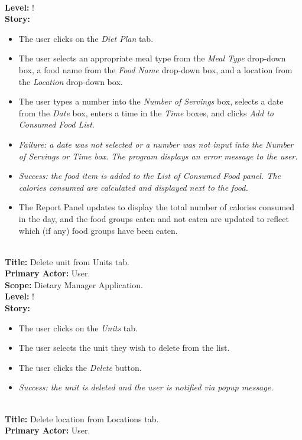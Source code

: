 \documentclass{article}
\begin{document}
\\
\textbf{Level:} !
\\
\textbf{Story:}
\begin{itemize}
    \item The user clicks on the \textit{Diet Plan} tab.
    \item The user selects an appropriate meal type from the \textit{Meal Type} drop-down box, a food name from the \textit{Food Name} drop-down box, and a location from the \textit{Location} drop-down box.
    \item The user types a number into the \textit{Number of Servings} box, selects a date from the \textit{Date} box, enters a time in the \textit{Time} boxes, and clicks \textit{Add to Consumed Food List}.
    \item \em Failure: \em a date was not selected or a number was not input into the Number of Servings or Time box. The program displays an error message to the user.
    \item \em Success: \em the food item is added to the List of Consumed Food panel. The calories consumed are calculated and displayed next to the food.
    \item The Report Panel updates to display the total number of calories consumed in the day, and the food groups eaten and not eaten are updated to reflect which (if any) food groups have been eaten.\\
\end{itemize}
\\
\textbf{Title:} Delete unit from Units tab.
\\
\textbf{Primary Actor:} User.
\\
\textbf{Scope:} Dietary Manager Application.
\\
\textbf{Level:} !
\\
\textbf{Story:}
\begin{itemize}
    \item The user clicks on the \textit{Units} tab.
    \item The user selects the unit they wish to delete from the list.
    \item The user clicks the \textit{Delete} button.
    \item \em Success: \em the unit is deleted and the user is notified via popup message.\\
\end{itemize}
\\
\textbf{Title:} Delete location from Locations tab.
\\
\textbf{Primary Actor:} User.
\end{document}
